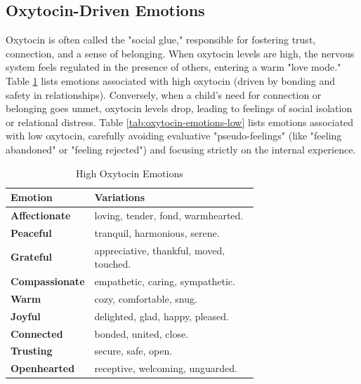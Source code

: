 \subsection{Oxytocin-Driven Emotions}

Oxytocin is often called the "social glue," responsible for fostering trust, connection, and a sense of belonging. 
When oxytocin levels are high, the nervous system feels regulated in the presence of others, entering a warm "love mode." 
Table \ref{tab:oxytocin-emotions} lists emotions associated with high oxytocin (driven by bonding and safety in relationships). 
Conversely, when a child's need for connection or belonging goes unmet, oxytocin levels drop, leading to feelings of social isolation or relational distress. 
Table \ref{tab:oxytocin-emotions-low} lists emotions associated with low oxytocin, carefully avoiding evaluative "pseudo-feelings" (like "feeling abandoned" or "feeling rejected") and focusing strictly on the internal experience.

\begin{table}[H]
\centering
\caption{High Oxytocin Emotions}
\begin{tabular}{@{}l p{0.7\linewidth}@{}}
\hline
\textbf{Emotion} & \textbf{Variations} \\
\hline
\textbf{Affectionate} & loving, tender, fond, warmhearted. \\
\textbf{Peaceful} & tranquil, harmonious, serene. \\
\textbf{Grateful} & appreciative, thankful, moved, touched. \\
\textbf{Compassionate} & empathetic, caring, sympathetic. \\
\textbf{Warm} & cozy, comfortable, snug. \\
\textbf{Joyful} & delighted, glad, happy, pleased. \\
\textbf{Connected} & bonded, united, close. \\
\textbf{Trusting} & secure, safe, open. \\
\textbf{Openhearted} & receptive, welcoming, unguarded. \\
\hline
\end{tabular}
\label{tab:oxytocin-emotions}
\end{table}

